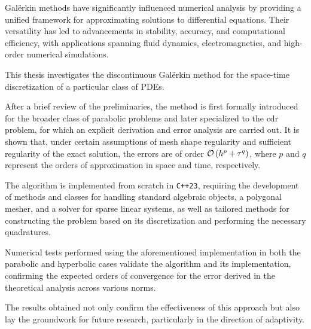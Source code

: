 Galërkin methods have significantly influenced numerical analysis by providing a unified framework for approximating solutions to differential equations. Their versatility has led to advancements in stability, accuracy, and computational efficiency, with applications spanning fluid dynamics, electromagnetics, and high-order numerical simulations.

This thesis investigates the discontinuous Galërkin method for the space-time discretization of a particular class of PDEs.

After a brief review of the preliminaries, the method is first formally introduced for the broader class of parabolic problems and later specialized to the \acrfull{cdr} problem, for which an explicit derivation and error analysis are carried out. It is shown that, under certain assumptions of mesh shape regularity and sufficient regularity of the exact solution, the errors are of order $\mathcal{O} \left( h^p + \tau^q \right)$, where $p$ and $q$ represent the orders of approximation in space and time, respectively.

The algorithm is implemented from scratch in \lstinline{C++23}, requiring the development of methods and classes for handling standard algebraic objects, a polygonal mesher, and a solver for sparse linear systems, as well as tailored methods for constructing the problem based on its discretization and performing the necessary quadratures.

Numerical tests performed using the aforementioned implementation in both the parabolic and hyperbolic cases validate the algorithm and its implementation, confirming the expected orders of convergence for the error derived in the theoretical analysis across various norms.

The results obtained not only confirm the effectiveness of this approach but also lay the groundwork for future research, particularly in the direction of adaptivity.